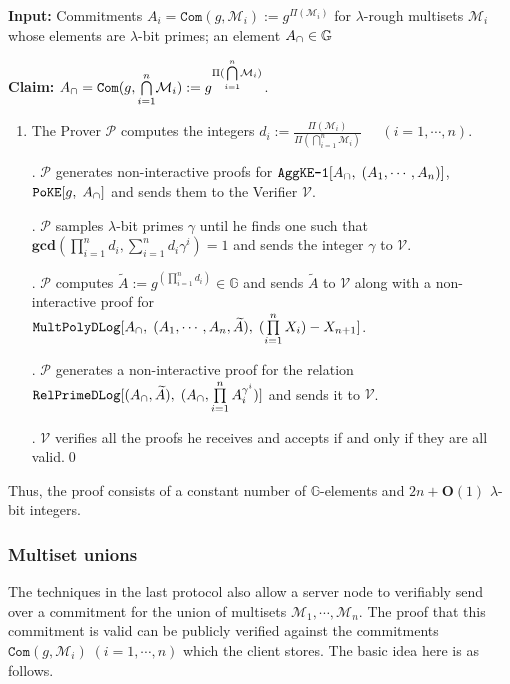\documentclass[11pt, lettersize, notitlepage, leqno, footskip=0.6cm]{article}
\newcommand{\pl}{\prod\limits}
\newcommand{\slim}{\sum\limits}
\newcommand{\ttt}{\texttt}
\newcommand{\bG}{\mathbb{G}}
\newcommand{\pr}{\protect}
\newcommand{\wti}{\widetilde}
\newcommand{\mc}{\mathcal}
\newcommand{\mb}{\mathbb}
\newcommand{\mbf}{\mathbf}
\newcommand{\lam}{\lambda}
\newcommand{\bO}{\mbf{O}}
\newcommand{\mP}{\mc{P}}
\newcommand{\V}{\mc{V}}
\newcommand{\mcM}{\mc{M}}
\newcommand{\vs}{\vspace{-0.15cm}}
\newcommand{\noin}{\noindent}
\newcommand{\GCD}{\mbf{gcd}}
\numberwithin{equation}{section}
\begin{document}
\noin \textbf{Input:} Commitments $A_i = \ttt{Com}(g, \mcM_i) := g^{\Pi(\mc{M}_i)}$ for $\lam$-rough multisets $\mc{M}_i$ whose elements are $\lam$-bit primes; an element $A_{\tt{\cap}}\in\mb{G}$

\noin \textbf{Claim:} $A_{\tt{\cap}} = \protect{\verb|Com|}(g, {\bigcap\limits_{i=1}^n} \mc{M}_i) := g^{\Pi({\bigcap\limits_{i=1}^n} \mc{M}_i)}$.

\begin{enumerate}[wide, labelwidth=!, labelindent=0pt]\vs \item The Prover $\mP$ computes the integers $d_i:= \frac{\Pi(\mc{M}_i)}{\Pi({\bigcap\limits_{i=1}^n} \mc{M}_i)}\;\;\;\;\; (i=1,\cdots,n).$

\noin 2. $\mP$ generates non-interactive proofs for $\pr{\ttt{AggKE-1}}[A_{\tt{\cap}},\;(A_1,\cdots,A_n)]$, $\ttt{PoKE}[g,\;A_{\tt{\cap}}]$ and sends them to the Verifier $\V$.

\noin 3. $\mP$ samples $\lam$-bit primes $\gamma$ until he finds one such that $ \GCD(\pl_{i=1}^n d_i, \slim_{i=1}^n d_i\gamma^i) = 1$ and sends the integer $\gamma$ to $\V$.

\noin 4. $\mP$ computes $\wti{A}:= g^{(\prod_{i=1}^n d_i)}\in\bG$ and sends $\wti{A}$ to $\V$ along with a non-interactive proof for\\ $\ttt{MultPolyDLog}[A_{\tt{\cap}},\; (A_1,\cdots,A_n, \wti{A}),\;(\pl_{i=1}^n X_i)-X_{n+1}]$.\vs

\noin 5. $\mP$ generates a non-interactive proof for the relation $\ttt{RelPrimeDLog}[(A_{\tt{\cap}}, \wti{A}),\;(A_{\tt{\cap}}, \pl_{i=1}^n A_i^{\gamma^i})]$ and sends it to $\V$.

\noin 6. $\V$ verifies all the proofs he receives and accepts if and only if they are all valid.\qed \end{enumerate}


\noin Thus, the proof consists of a constant number of $\bG$-elements and $2n+\bO(1)$ $\lam$-bit integers. 
 




\subsubsection{\fontsize{11}{11}\selectfont Multiset unions }

\noin The techniques in the last protocol also allow a server node to verifiably send over a commitment for the union of multisets $\mcM_1,\cdots,\mcM_n$. The proof that this commitment is valid can be publicly verified against the commitments $\ttt{Com}(g,\mc{M}_i)\;(i=1,\cdots,n)$ which the client stores. The basic idea here is as follows.
\end{document}
